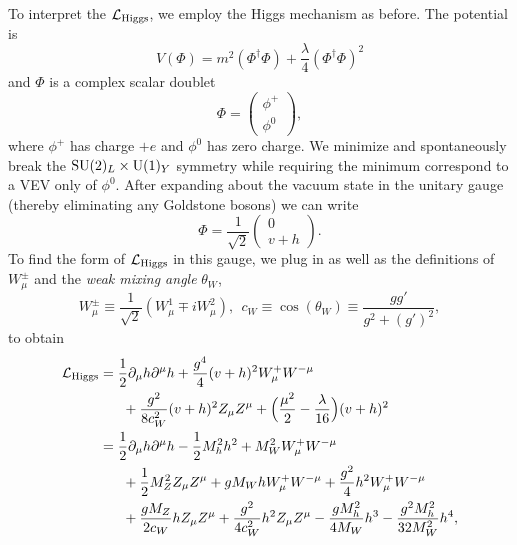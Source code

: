 To interpret the $\mathcal{L}_{\rm Higgs}$, we employ the Higgs mechanism 
as before. The potential is
\begin{equation}
  \label{eq:Higgpot}
  V(\Phi)=m^2(\Phi^{\dagger}\Phi)+\frac{\lambda}{4}(\Phi^{\dagger}\Phi)^2
\end{equation}
and $\Phi$ is a complex scalar doublet
\begin{equation}
  \label{eq:newphi}
  \Phi=
  \begin{pmatrix}
    \phi^{+} \\
    \phi^{0}
  \end{pmatrix},
\end{equation}
where $\phi^{+}$ has charge $+e$ and $\phi^{0}$ has zero charge. We minimize
 and spontaneously break the $\operatorname{SU}(2)_{L}\times\operatorname{U}(1)_{Y}$ 
symmetry while requiring the minimum correspond to a VEV only of $\phi^{0}$.
After expanding about the vacuum state in the unitary 
gauge (thereby eliminating any Goldstone bosons) we can write
\begin{equation}
  \label{eq:Higgsphi}
  \Phi=\frac{1}{\sqrt{2}}
  \begin{pmatrix}
    0 \\
    v+h
  \end{pmatrix}.
\end{equation}
To find the form of $\mathcal{L}_{\rm Higgs}$ in this gauge, we plug in 
as well as the definitions of $W^{\pm}_{\mu}$ and the {\it weak mixing angle} 
$\theta_W$,
\begin{equation}
  W^{\pm}_{\mu}\equiv\frac{1}{\sqrt{2}}(W^{1}_{\mu}\mp iW^{2}_{\mu}),
  \ \ c_W\equiv\cos(\theta_W)\equiv\frac{gg'}{g^2+(g')^2},
\end{equation}
to obtain
\begin{equation}
  \label{eq:LagrHiggs}
  \begin{aligned}
    \mathcal{L}_{\rm Higgs}&=\frac{1}{2}\partial_{\mu}h\partial^{\mu}h
                   +\frac{g^4}{4}(v+h)^{2}W^+_{\mu}W^{-\mu} \\
       & ~~~~~     +\frac{g^2}{8c_{W}^{2}}(v+h)^{2}Z_{\mu}Z^{\mu}
                   +\Big(\frac{\mu^2}{2}-\frac{\lambda}{16}\Big)(v+h)^{2} \\
       &=\frac{1}{2}\partial_{\mu}h\partial^{\mu}h
         -\frac{1}{2}M_{h}^{2}h^2 + M_{W}^{2}W^+_{\mu}W^{-\mu} \\
       & ~~~~~ +\frac{1}{2}M_{Z}^{2}Z_{\mu}Z^{\mu} 
         + gM_{W}hW^+_{\mu}W^{-\mu}
         +\frac{g^2}{4}h^{2}W^+_{\mu}W^{-\mu} \\
       & ~~~~~ +\frac{gM_{Z}}{2c_{W}}hZ_{\mu}Z^{\mu}
         +\frac{g^2}{4c_{W}^{2}}h^{2}Z_{\mu}Z^{\mu}
         -\frac{gM_{h}^2}{4M_W}h^3 - \frac{g^{2}M_{h}^2}{32M_{W}^2}h^4,
  \end{aligned}
\end{equation}

